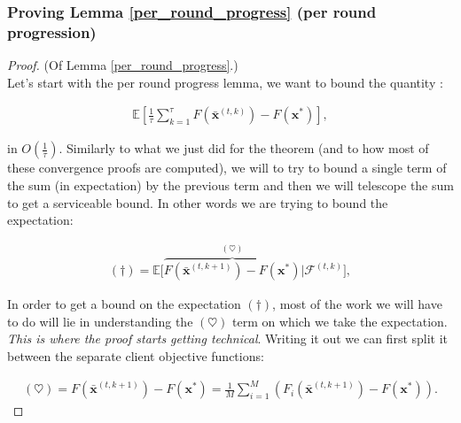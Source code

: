 \subsubsection*{Proving Lemma \ref{per_round_progress} (per round progression)}
\begin{proof}  (Of Lemma \ref{per_round_progress}.)\\
    
Let's start with the per round progress lemma, we want to bound the quantity : 

\begin{align*}
    \mathbb{E} \left[ \frac{1}{\tau} \sum_{k=1}^{\tau} F(\bar{\bm{x}}^{(t,k)}) - F(\bm{x}^*)\right],
\end{align*}

in $O(\frac{1}{\tau})$. Similarly to what we just did for the theorem (and to how most of these convergence proofs are computed), we will to try to bound a single term of the sum (in expectation) by the previous term and then we will telescope the sum to get a serviceable bound. In other words we are trying to bound the expectation:

\begin{align}
    (\dagger) = \mathbb{E} \Big[ \overbrace{F(\bar{\bm{x}}^{(t,k+1)}) - F(\bm{x}^*)}^{(\heartsuit)} | \mathcal{F}^{(t,k)}\Big],
    \label{eq:expected_sub_progress}
\end{align}

In order to get a bound on the expectation $(\dagger)$, most of the work we will have to do will lie in understanding the $(\heartsuit)$ term on which we take the expectation. \textit{This is where the proof starts getting technical}. Writing it out we can first split it between the separate client objective functions:

\begin{align}
    (\heartsuit) = F(\bar{\bm{x}}^{(t,k+1)}) - F(\bm{x}^*) = \frac{1}{M} \sum_{i=1}^M \left( F_i(\bar{\bm{x}}^{(t,k+1)})  - F(\bm{x}^*)\right).
    \label{eq:sub_progress}
\end{align}


\end{proof}
